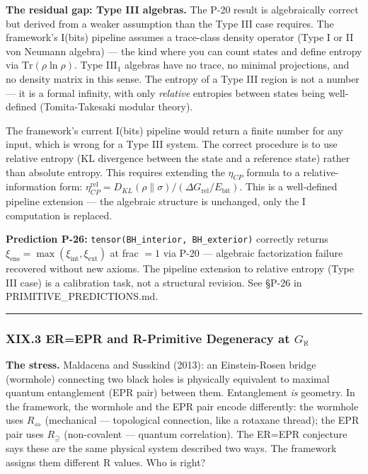 \documentclass[12pt,a4paper]{article}
\begin{document}
\textbf{The residual gap: Type III algebras.} The P-20 result is algebraically correct but derived from a weaker assumption than the Type III case requires. The framework's I(bits) pipeline assumes a trace-class density operator (Type I or II von Neumann algebra) --- the kind where you can count states and define entropy via $\text{Tr}(\rho \ln \rho)$. Type III$_1$ algebras have no trace, no minimal projections, and no density matrix in this sense. The entropy of a Type III region is not a number --- it is a formal infinity, with only \emph{relative} entropies between states being well-defined (Tomita-Takesaki modular theory).

The framework's current I(bits) pipeline would return a finite number for any input, which is wrong for a Type III system. The correct procedure is to use relative entropy (KL divergence between the state and a reference state) rather than absolute entropy. This requires extending the $\eta_{CP}$ formula to a relative-information form: $\eta_{CP}^{\text{rel}} = D_{KL}(\rho \| \sigma) / (\Delta G_{\text{rel}} / E_{\text{bit}})$. This is a well-defined pipeline extension --- the algebraic structure is unchanged, only the I computation is replaced.

\textbf{Prediction P-26:} \texttt{tensor(BH\_interior, BH\_exterior)} correctly returns $\xi_{\text{ens}} = \max(\xi_{\text{int}}, \xi_{\text{ext}})$ at frac $= 1$ via P-20 --- algebraic factorization failure recovered without new axioms. The pipeline extension to relative entropy (Type III case) is a calibration task, not a structural revision. See §P-26 in PRIMITIVE\_PREDICTIONS.md.

\begin{center}
\rule{0.5\textwidth}{0.4pt}
\end{center}

\subsubsection{XIX.3 ER=EPR and R-Primitive Degeneracy at $G_{\aleph}$}

\textbf{The stress.} Maldacena and Susskind (2013): an Einstein-Rosen bridge (wormhole) connecting two black holes is physically equivalent to maximal quantum entanglement (EPR pair) between them. Entanglement \emph{is} geometry. In the framework, the wormhole and the EPR pair encode differently: the wormhole uses $R_{\Leftrightarrow}$ (mechanical --- topological connection, like a rotaxane thread); the EPR pair uses $R_{\supseteq}$ (non-covalent --- quantum correlation). The ER=EPR conjecture says these are the same physical system described two ways. The framework assigns them different R values. Who is right?
\end{document}
